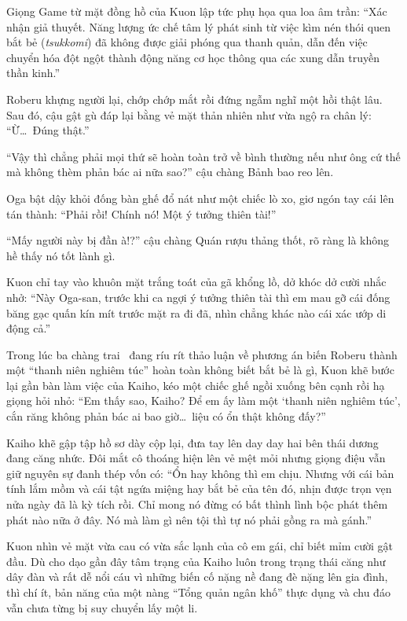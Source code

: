\documentclass[../main.tex]{subfiles}
\begin{document}
Giọng Game từ mặt đồng hồ của Kuon lập tức phụ họa qua loa âm trần: ``Xác nhận giả thuyết. Năng lượng ức chế tâm lý phát sinh từ việc kìm nén thói quen bắt bẻ (\textit{tsukkomi}) đã không được giải phóng qua thanh quản, dẫn đến việc chuyển hóa đột ngột thành động năng cơ học thông qua các xung dẫn truyền thần kinh.''

Roberu khựng người lại, chớp chớp mắt rồi đứng ngẫm nghĩ một hồi thật lâu. Sau đó, cậu gật gù đáp lại bằng vẻ mặt thản nhiên như vừa ngộ ra chân lý: ``Ừ\dots\ Đúng thật.''

``Vậy thì chẳng phải mọi thứ sẽ hoàn toàn trở về bình thường nếu như ông cứ thế mà không thèm phản bác ai nữa sao?'' cậu chàng Bảnh bao reo lên.

Oga bật dậy khỏi đống bàn ghế đổ nát như một chiếc lò xo, giơ ngón tay cái lên tán thành: ``Phải rồi! Chính nó! Một ý tưởng thiên tài!''

``Mấy người này bị đần à!?'' cậu chàng Quán rượu thảng thốt, rõ ràng là không hề thấy nó tốt lành gì.

Kuon chỉ tay vào khuôn mặt trắng toát của gã khổng lồ, dở khóc dở cười nhắc nhở: ``Này Oga-san, trước khi ca ngợi ý tưởng thiên tài thì em mau gỡ cái đống băng gạc quấn kín mít trước mặt ra đi đã, nhìn chẳng khác nào cái xác ướp di động cả.''

Trong lúc ba chàng trai \hls\ đang ríu rít thảo luận về phương án biến Roberu thành một ``thanh niên nghiêm túc'' hoàn toàn không biết bắt bẻ là gì, Kuon khẽ bước lại gần bàn làm việc của Kaiho, kéo một chiếc ghế ngồi xuống bên cạnh rồi hạ giọng hỏi nhỏ: ``Em thấy sao, Kaiho? Để em ấy làm một `thanh niên nghiêm túc', cắn răng không phản bác ai bao giờ\dots\ liệu có ổn thật không đấy?''

Kaiho khẽ gập tập hồ sơ dày cộp lại, đưa tay lên day day hai bên thái dương đang căng nhức. Đôi mắt cô thoáng hiện lên vẻ mệt mỏi nhưng giọng điệu vẫn giữ nguyên sự đanh thép vốn có: ``Ổn hay không thì em chịu. Nhưng với cái bản tính lắm mồm và cái tật ngứa miệng hay bắt bẻ của tên đó, nhịn được trọn vẹn nửa ngày đã là kỳ tích rồi. Chỉ mong nó đừng có bất thình lình bộc phát thêm phát nào nữa ở đây. Nó mà làm gì nên tội thì tự nó phải gồng ra mà gánh.''

Kuon nhìn vẻ mặt vừa cau có vừa sắc lạnh của cô em gái, chỉ biết mỉm cười gật đầu. Dù cho dạo gần đây tâm trạng của Kaiho luôn trong trạng thái căng như dây đàn và rất dễ nổi cáu vì những biến cố nặng nề đang đè nặng lên gia đình, thì chí ít, bản năng của một nàng ``Tổng quản ngân khố'' thực dụng và chu đáo vẫn chưa từng bị suy chuyển lấy một li.
\end{document}
